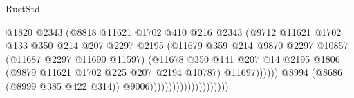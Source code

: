 \begin{lexlean}{RustStd}
\begin{coremodule}
                                                  @1820
                                                  @2343
                                                  (@8818
                                                    @11621
                                                    @1702
                                                    @410
                                                    @216
                                                    @2343
                                                    (@9712
                                                      @11621
                                                      @1702
                                                      @133
                                                      @350
                                                      @214
                                                      @207
                                                      @2297
                                                      @2195
                                                      (@11679
                                                        @359
                                                        @214
                                                        @9870
                                                        @2297
                                                        @10857
                                                        (@11687 @2297 @11690 @11597)
                                                        (@11678
                                                          @350
                                                          @141
                                                          @207
                                                          @14
                                                          @2195
                                                          @1806
                                                          (@9879
                                                            @11621
                                                            @1702
                                                            @225
                                                            @207
                                                            @2194
                                                            @10787)
                                                          @11697))))))
                                              @8994
                                              (@8686 (@8999 @385 @422 @314))
                                              @9006)))))))))))))))))))))

\end{coremodule}
\end{lexlean}
